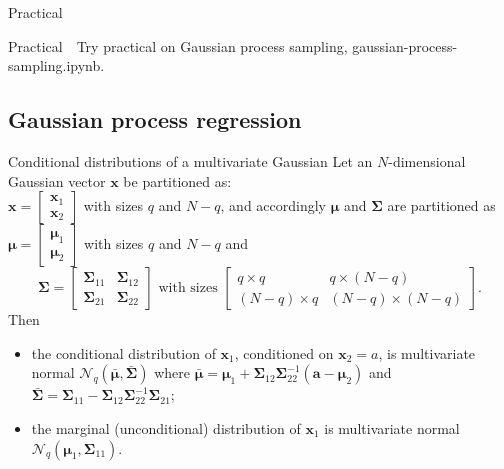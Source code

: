 \begin{frame}{Practical}
\begin{alertblock}{Practical}
	\ComputerMouse\,\, Try practical on Gaussian process sampling,  \alert{gaussian-process-sampling.ipynb}.
\end{alertblock}
\end{frame}

\subsection{Gaussian process regression}


\begin{frame}{Conditional distributions of a multivariate Gaussian}
Let an $N$-dimensional Gaussian vector $\mathbf {x}$  be partitioned as:\\  
$\mathbf {x}={\begin{bmatrix}\mathbf {x} _{1}\\\mathbf {x} _{2}\end{bmatrix}}$ with sizes $q$ and $N-q$, and accordingly ${\boldsymbol {\mu }}$ and ${\boldsymbol \Sigma}$ are partitioned as
${\boldsymbol {\mu }}={\begin{bmatrix}{\boldsymbol {\mu }}_{1}\\{\boldsymbol {\mu }}_{2}\end{bmatrix}}$ with sizes $q$ and $N-q$ and 
$${\displaystyle {\boldsymbol {\Sigma }}={\begin{bmatrix}{\boldsymbol {\Sigma }}_{11}&{\boldsymbol {\Sigma }}_{12}\\{\boldsymbol {\Sigma }}_{21}&{\boldsymbol {\Sigma }}_{22}\end{bmatrix}}{\text{ with sizes }}{\begin{bmatrix}q\times q&q\times (N-q)\\(N-q)\times q&(N-q)\times (N-q)\end{bmatrix}}}.$$
Then 
\begin{itemize}
	\item the \alert{conditional distribution} of $ \mathbf x_1$, conditioned on $\mathbf x_2 = a$, is multivariate normal $\mathcal{N}_q( \bar{ \boldsymbol {\mu} }, \bar{ \boldsymbol {\Sigma} })$ where
${ {\bar {\boldsymbol {\mu }}}={\boldsymbol {\mu }}_{1}+{\boldsymbol {\Sigma }}_{12}{\boldsymbol {\Sigma }}_{22}^{-1}\left(\mathbf {a} -{\boldsymbol {\mu }}_{2}\right)}$
and 
${ {\bar {\boldsymbol {\Sigma }}}={\boldsymbol {\Sigma }}_{11}-{\boldsymbol {\Sigma }}_{12}{\boldsymbol {\Sigma }}_{22}^{-1}{\boldsymbol {\Sigma }}_{21}}$;
	\item the \alert{marginal (unconditional) distribution} of $ \mathbf x_1$ is multivariate normal $\mathcal{N}_q( \boldsymbol {\mu}_1, \boldsymbol {\Sigma }_{11})$.
\end{itemize}

\end{frame}


